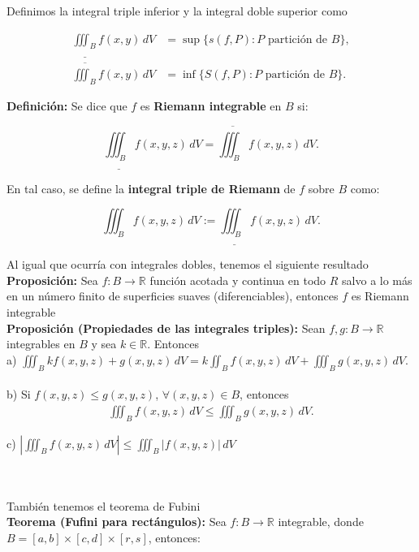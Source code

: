 \documentclass{article}
\theoremstyle{definition}
\begin{document}
Definimos la integral triple inferior y la integral doble superior como

\begin{align*}
    \underline{\iiint_B} f(x,y)\,dV &= \sup \{ s(f,P) : P \text{ partición de } B \}, \\
    \overline{\iiint_B} f(x,y)\,dV &= \inf \{ S(f,P) : P \text{ partición de } B \}.
\end{align*}


\textbf{Definición: }Se dice que \( f \) es \textbf{Riemann integrable} en \( B \) si:

\[
    \underline{\iiint_B} f(x,y,z)\,dV = \overline{\iiint_B} f(x,y,z)\,dV.
\]

En tal caso, se define la \textbf{integral triple de Riemann} de \( f \) sobre \( B \) como:

\[
    \iiint_B f(x,y,z)\,dV := \underline{\iiint_B} f(x,y,z)\,dV.
\]


Al igual que ocurr\'ia con integrales dobles, tenemos el siguiente resultado\\

\textbf{Proposición:} Sea $f: B \to \mathbb{R}$ función acotada y continua en todo $R$ salvo a lo más en un número finito de superficies suaves (diferenciables), entonces $f$ es Riemann integrable \\

\textbf{Proposición (Propiedades de las integrales triples):} Sean $f,g: B \to \mathbb{R}$ integrables en $B$ y sea $k \in \mathbb{R}$. Entonces \\

a) $\displaystyle \iiint_B kf(x,y,z)+g(x,y,z) \,dV = k\iint_B f(x,y,z)\,dV+ \iiint_B g(x,y,z) \,dV.$ \\ \\

b) Si $f(x,y,z) \leq g(x,y,z) $, $\forall (x,y,z) \in B$, entonces 
\begin{align*}
    \displaystyle \iiint_B f(x,y,z)\,dV \leq \iiint_B g(x,y,z) \,dV. 
\end{align*}

c) $\displaystyle \left|\iiint_B f(x,y,z) \,dV\right| \leq \iiint_B |f(x,y,z)|\,dV$ \\ \\\

Tambi\'en tenemos el teorema de Fubini \\


\textbf{Teorema (Fufini para rectángulos):} Sea $f: B \to \mathbb{R}$ integrable, donde $B =[a,b]\times [c,d] \times [r,s]$, entonces:
\end{document}
